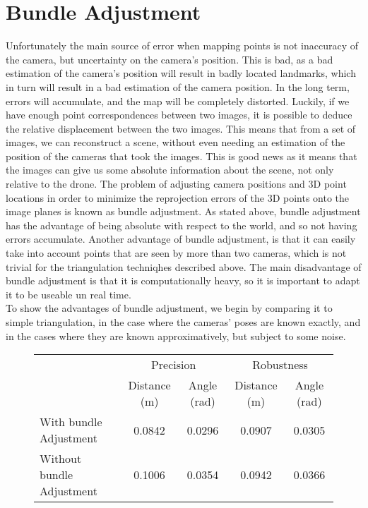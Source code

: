\section{Bundle Adjustment}
Unfortunately the main source of error when mapping points is not inaccuracy of the camera, but uncertainty on the camera's position. This is bad, as a bad estimation of the camera's position will result in badly located landmarks, which in turn will result in a bad estimation of the camera position. In the long term, errors will accumulate, and the map will be completely distorted. Luckily, if we have enough point correspondences between two images, it is possible to deduce the relative displacement between the two images. This means that from a set of images, we can reconstruct a scene, without even needing an estimation of the position of the cameras that took the images. This is good news as it means that the images can give us some absolute information about the scene, not only relative to the drone. The problem of adjusting camera positions and 3D point locations in order to minimize the reprojection errors of the 3D points onto the image planes is known as bundle adjustment. As stated above, bundle adjustment has the advantage of being absolute with respect to the world, and so not having errors accumulate. Another advantage of bundle adjustment, is that it can easily take into account points that are seen by more than two cameras, which is not trivial for the triangulation techniqhes described above. The main disadvantage of bundle adjustment is that it is computationally heavy, so it is important to adapt it to be useable un real time.\\
To show the advantages of bundle adjustment, we begin by comparing it to simple triangulation, in the case where the cameras' poses are known exactly, and in the cases where they are known approximatively, but subject to some noise.

\begin{figure}[H]
  \begin{center}
    \begin{tabular}{l c c c c }
      \toprule
      {}                        & \multicolumn{2}{c}{Precision} &  \multicolumn{2}{c}{Robustness} \\
      {}                        & Distance (m) & Angle (rad)    &  Distance (m) & Angle (rad)  \\ \midrule
      With bundle Adjustment    & 0.0842       & 0.0296         &  0.0907       &  0.0305 \\
      Without bundle Adjustment & 0.1006       & 0.0354         &  0.0942       &  0.0366 \\
      \bottomrule
    \end{tabular}
  \end{center}
\end{figure}


